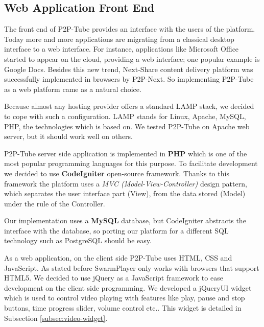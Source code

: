 \subsection{Web Application Front End}
\label{subsec:front-end}

The front end of P2P-Tube provides an interface with the users of the platform. Today more and more applications are migrating from a classical desktop interface to a web interface. For instance, applications like Microsoft Office started to appear on the cloud, providing a web interface; one popular example is Google Docs. Besides this new trend, Next-Share content delivery platform was successfully implemented in browsers by P2P-Next. So implementing P2P-Tube as a web platform came as a natural choice.

Because almost any hosting provider offers a standard LAMP stack, we decided to cope with such a configuration. LAMP stands for Linux, Apache, MySQL, PHP, the technologies which is based on. We tested P2P-Tube on Apache web server, but it should work well on others.

P2P-Tube server side application is implemented in \textbf{PHP} which is one of the most popular programming languages for this purpose. To facilitate development we decided to use \textbf{CodeIgniter} \cite{code-igniter} open-source framework. Thanks to this framework the platform uses a \textit{MVC (Model-View-Controller)} design pattern, which separates the user interface part (View), from the data stored (Model) under the rule of the Controller.

Our implementation uses a \textbf{MySQL} database, but CodeIgniter abstracts the interface with the database, so porting our platform for a different SQL technology such as PostgreSQL should be easy.

As a web application, on the client side P2P-Tube uses HTML, CSS and JavaScript. As stated before SwarmPlayer only works with browsers that support HTML5. We decided to use jQuery \cite{jquery} as a JavaScript framework to ease development on the client side programming. We developed a jQueryUI \cite{jqueryui} widget which is used to control video playing with features like play, pause and stop buttons, time progress slider, volume control etc.. This widget is detailed in Subsection \ref{subsec:video-widget}.

